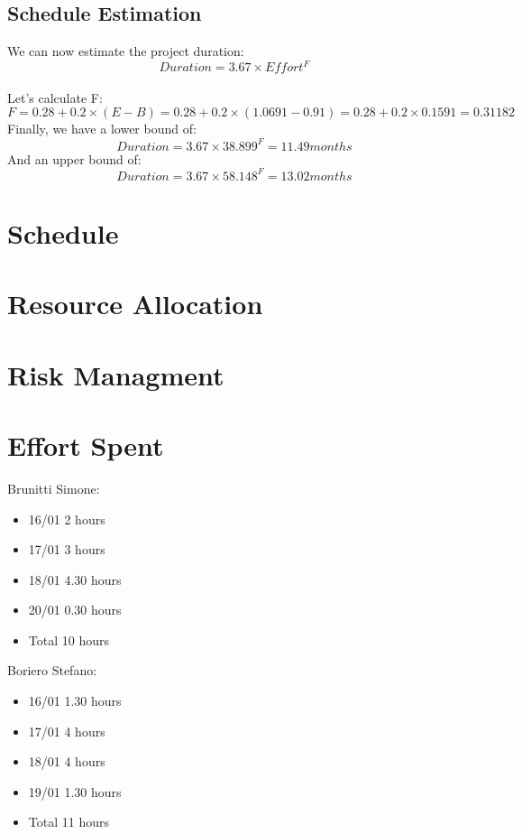 \documentclass{article}
\begin{document}
\subsection{Schedule Estimation}
We can now estimate the project duration:\\
$$\displaystyle Duration = 3.67 \times Effort^F $$ \\
Let's calculate F:\\
$$\displaystyle F = 0.28 + 0.2 \times (E - B) = 0.28 + 0.2\times (1.0691 - 0.91) = 0.28 + 0.2\times 0.1591 = 0.31182 $$
Finally, we have a lower bound of:\\
$$\displaystyle Duration = 3.67 \times 38.899^F = 11.49 months $$ 
And an upper bound of:\\
$$\displaystyle Duration = 3.67 \times 58.148^F = 13.02 months $$ 
\newpage
\section{Schedule}

\newpage
\section{Resource Allocation}

\newpage
\section{Risk Managment}

\newpage
\section{Effort Spent}
Brunitti Simone:
\begin{itemize}
\item 16/01 2 hours
\item 17/01 3 hours
\item 18/01 4.30 hours
\item 20/01 0.30 hours
\item Total 10 hours
\end{itemize}
Boriero Stefano:
\begin{itemize}
\item 16/01	1.30 hours
\item 17/01	4 hours
\item 18/01	4 hours
\item 19/01	1.30 hours
\item Total 11 hours
\end{itemize}
\end{document}
